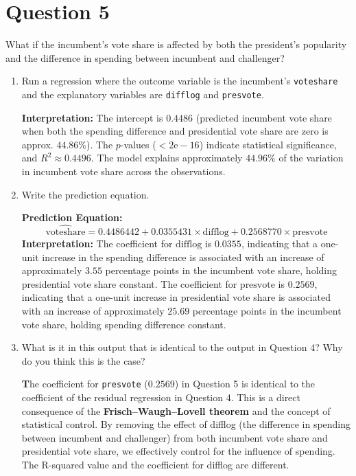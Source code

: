 \documentclass[12pt,letterpaper]{article}
\begin{document}
	\section*{Question 5}
	\noindent What if the incumbent's vote share is affected by both the president's popularity and the difference in spending between incumbent and challenger? 
	\begin{enumerate}
		\item Run a regression where the outcome variable is the incumbent's \texttt{voteshare} and the explanatory variables are \texttt{difflog} and \texttt{presvote}.	
		
		
		
		\textbf{Interpretation:} 
		The intercept is $0.4486$ (predicted incumbent vote share when both the spending difference and presidential vote share are zero is approx. $44.86\%$). The $p$-values ($<2\text{e}-16$) indicate statistical significance, and $R^2 \approx 0.4496$. The model explains approximately $44.96\%$ of the variation in incumbent vote share across the observations.
					\vspace{.5cm}
		\item Write the prediction equation.	
		
		\textbf{Prediction Equation:}
		$$\widehat{\text{voteshare}} = 0.4486442 + 0.0355431 \times \text{difflog} + 0.2568770 \times \text{presvote}$$
		\textbf{Interpretation:} 
		The coefficient for $\text{difflog}$ is $0.0355$, indicating that a one-unit increase in the spending difference is associated with an increase of approximately $3.55$ percentage points in the incumbent vote share, holding presidential vote share constant. The coefficient for $\text{presvote}$ is $0.2569$, indicating that a one-unit increase in presidential vote share is associated with an increase of approximately $25.69$ percentage points in the incumbent vote share, holding spending difference constant. 
					\vspace{.5cm}
		\item What is it in this output that is identical to the output in Question 4? Why do you think this is the case?
		
		\textbf
		The coefficient for \texttt{presvote} ($0.2569$) in Question 5 is identical to the coefficient of the residual regression in Question 4. This is a direct consequence of the \textbf{Frisch--Waugh--Lovell theorem} and the concept of statistical control. By removing the effect of difflog (the difference in spending between incumbent and challenger) from both incumbent vote share and presidential vote share, we effectively control for the influence of spending. The R-squared value and the coefficient for difflog are different.
	\end{enumerate}
	
\end{document}
